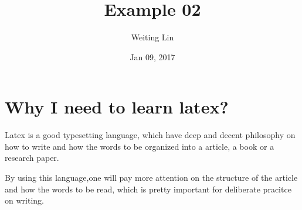 \documentclass{article}
\begin{document}
\title{Example 02}
\author{Weiting Lin}
\date{Jan 09, 2017}
\maketitle
\section{Why I need to learn latex?}
Latex is a good typesetting language, which have deep and decent
philosophy on how to write and how the words to be organized into
a article, a book or a research paper.

By using this language,one will pay more attention on the structure
of the article and how the words to be read, which is pretty important
for deliberate pracitce on writing.
\end{document}
